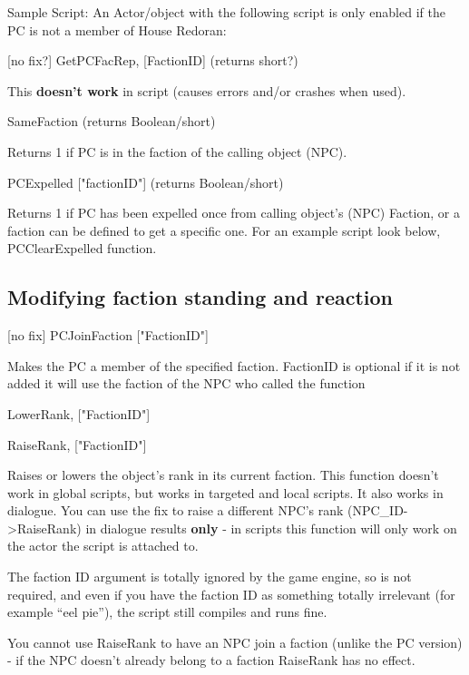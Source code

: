 Sample Script: An Actor/object with the following script is only enabled
if the PC is not a member of House Redoran:



{[}no fix?{]} GetPCFacRep, {[}FactionID{]} (returns short?)

This \textbf{doesn't work} in script (causes errors and/or crashes when
used).

SameFaction (returns Boolean/short)

Returns 1 if PC is in the faction of the calling object (NPC).

PCExpelled {[}"factionID"{]} (returns Boolean/short)

Returns 1 if PC has been expelled once from calling object's (NPC)
Faction, or a faction can be defined to get a specific one. For an
example script look below, PCClearExpelled function.

\hypertarget{modifying-faction-standing-and-reaction}{%
\subsection{Modifying faction standing and
reaction}\label{modifying-faction-standing-and-reaction}}

{[}no fix{]} PCJoinFaction {[}"FactionID"{]}

Makes the PC a member of the specified faction. FactionID is optional if
it is not added it will use the faction of the NPC who called the
function

LowerRank, {[}"FactionID"{]}

RaiseRank, {[}"FactionID"{]}

Raises or lowers the object's rank in its current faction. This function
doesn't work in global scripts, but works in targeted and local scripts.
It also works in dialogue. You can use the fix to raise a different
NPC's rank (NPC\_ID-\textgreater RaiseRank) in dialogue results
\textbf{only} - in scripts this function will only work on the actor the
script is attached to.

The faction ID argument is totally ignored by the game engine, so is not
required, and even if you have the faction ID as something totally
irrelevant (for example ``eel pie''), the script still compiles and runs
fine.

You cannot use RaiseRank to have an NPC join a faction (unlike the PC
version) - if the NPC doesn't already belong to a faction RaiseRank has
no effect.

